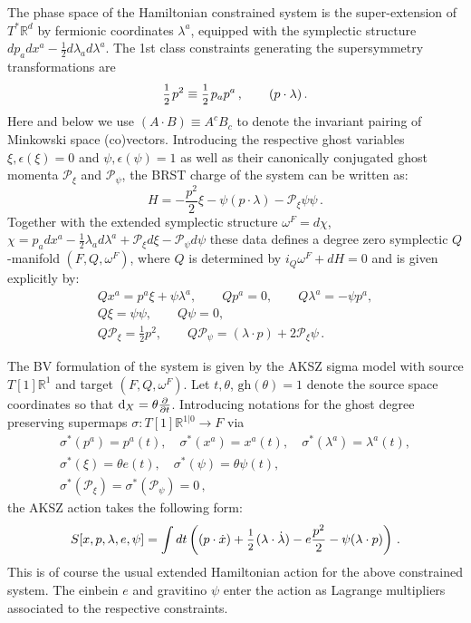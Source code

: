 \documentclass[a4paper,12pt]{article}
\numberwithin{equation}{section} %
\newcommand{\gh}[1]{\mathrm{gh}(#1)}
\newcommand{\dx}{\mathrm{d}_X}
\renewcommand{\d}{\partial}
\newcommand{\half}{\mathchoice{%
    \ffrac{1}{2}}{\frac{1}{2}}{\frac{1}{2}}{\frac{1}{2}}}
\newcommand{\ffrac}[2]{\raisebox{.5pt}%
  {\footnotesize$\displaystyle\frac{#1}{#2}$}\kern1pt}
\newcommand{\dl}[1]{\mathchoice{\ffrac{\d}{\d #1}}{\frac{\d}{\d #1}}{\ffrac{\d}{\d #1}}{\ffrac{\d}{\d #1}}}
\newcommand{\fR}{\mathbb{R}}
\def\cP{\mathcal{P}}
\numberwithin{equation}{section}
\newcommand{\atheta}{\theta}
\begin{document}
The phase space of the Hamiltonian constrained system is the super-extension of $T^*\fR^d$ by fermionic coordinates $\lambda^a$, equipped with the symplectic structure $dp_a dx^a - \frac{1}{2}d\lambda_a d\lambda^a$. The 1st class constraints generating the supersymmetry transformations are
\begin{equation}
\half p^2\equiv  \half p_ap^a\,, \qquad (p\cdot \lambda)\,.
\end{equation}
Here and below we use $(A\cdot B)\equiv A^cB_c$ to denote the invariant pairing of Minkowski space (co)vectors. Introducing the respective ghost variables $\xi,\epsilon(\xi)=0$ and $\psi,\epsilon(\psi)=1$ as well as their canonically conjugated ghost momenta $\cP_\xi$ and $\cP_\psi$, the BRST charge of the system can be written as:
\begin{equation}
H = -\frac{p^2}{2}\xi - \psi (p\cdot\lambda) - \mathcal{P}_\xi \psi\psi\,.
\end{equation}
Together with the extended symplectic structure $\omega^F=d\chi$, $\chi=p_a dx^a - \frac{1}{2}\lambda_a d\lambda^a + \mathcal{P}_\xi d\xi - \mathcal{P}_\psi d\psi$ these data defines a degree zero symplectic $Q$-manifold $(F,Q,\omega^F)$, where $Q$ is determined by $i_Q\omega^F+dH=0$ and is given explicitly by:
\begin{equation}
\begin{gathered}
    Qx^a = p^a\xi + \psi \lambda^a,\qquad
    Qp^a = 0,\qquad 
    Q\lambda^a = -\psi p^a,\\
    Q\xi = \psi \psi,\qquad Q\psi =0,\\
    Q\mathcal{P}_\xi = \frac{1}{2}p^2,\qquad
    Q\mathcal{P}_\psi = (\lambda\cdot p) + 2\mathcal{P}_\xi\psi\,.
\end{gathered}
\end{equation}

The BV formulation of the system is given by the AKSZ sigma model with source $T[1]\fR^1$ and target $(F,Q,\omega^F)$.
Let $t,\theta$, $\gh{\theta}=1$ denote the source space coordinates so that $\dx=\theta\dl{t}$. Introducing notations for the ghost degree preserving supermaps  $\sigma: T[1]\mathbb{R}^{1|0} \to F$ via
\begin{equation}
\begin{gathered}
    \sigma^\ast(p^a) = p^a(t), \quad \sigma^\ast(x^a) = x^a(t), \quad \sigma^\ast(\lambda^a) = \lambda^a(t),\\
        \sigma^\ast(\xi) = \atheta e(t), \quad \sigma^\ast(\psi) = \atheta\psi(t), \\
        \sigma^\ast(\mathcal{P}_\xi) =\sigma^\ast(\mathcal{P}_\psi) = 0\,,
\end{gathered}
\end{equation}
the AKSZ action takes the following form:
\begin{equation}
\label{ext-hamiltonian}
S[x,p,\lambda,e,\psi]=\int dt\left((p\cdot\dot x)+\half (\lambda \cdot \dot \lambda) -e \frac{p^2}{2}-\psi (\lambda\cdot p) \right) \,.  
\end{equation}
This is of course the usual extended Hamiltonian action for the above constrained system. The einbein $e$ and gravitino $\psi$ enter the action as Lagrange multipliers associated to the respective constraints.
\end{document}
